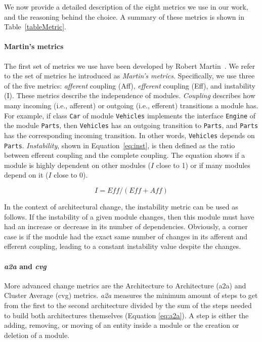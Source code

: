 \documentclass[sigconf, anonymous, review]{acmart}
\begin{document}
We now provide a detailed description of the eight metrics we use in our work, and the reasoning behind the choice.
A summary of these metrics is shown in Table~\ref{tableMetric}.


\paragraph{Martin's metrics} 
The first set of metrics we use have been developed by Robert Martin~\cite{martinsMetrics}.
We refer to the set of metrics he introduced as \textit{Martin's metrics}.
Specifically, we use three of the five metrics: \textit{afferent} coupling (Aff), \textit{efferent} coupling (Eff), and instability (I).
These metrics describe the independence of modules. 
\textit{Coupling} describes how many incoming (i.e., afferent) or outgoing (i.e., efferent) transitions a module has. 
For example, if class \texttt{Car} of module \texttt{Vehicles} implements the interface \texttt{Engine} of the module \texttt{Parts}, then \texttt{Vehicles} has an outgoing transition to \texttt{Parts}, and \texttt{Parts} has the corresponding incoming transition. 
In other words, \texttt{Vehicles} depends on \texttt{Parts}.
\textit{Instability}, shown in Equation~\ref{eq:inst}, is then defined as the ratio between efferent coupling and the complete coupling.
The equation shows if a module is highly dependent on other modules ($I$ close to 1) or if many modules depend on it ($I$ close to 0).

\begin{equation} \label{eq:inst}
I = \textit{Eff} / (\textit{Eff} + \textit{Aff})
\end{equation}

In the context of architectural change, the instability metric can be used as follows. If the instability of a given module changes, then this module must have had an increase or decrease in its number of dependencies. 
Obviously, a corner case is if the module had the exact same number of changes in its afferent and efferent coupling, leading to a constant instability value despite the changes.

\paragraph{\textit{a2a} and \textit{cvg}} More advanced change metrics are the Architecture to Architecture (a2a) and Cluster Average (cvg) metrics. 
\textit{a2a} measures the minimum amount of steps to get from the first to the second architecture divided by the sum of the steps needed to build both architectures themselves (Equation \ref{eq:a2a}). A step is either the adding, removing, or moving of an entity inside a module or the creation or deletion of a module. 
\end{document}
